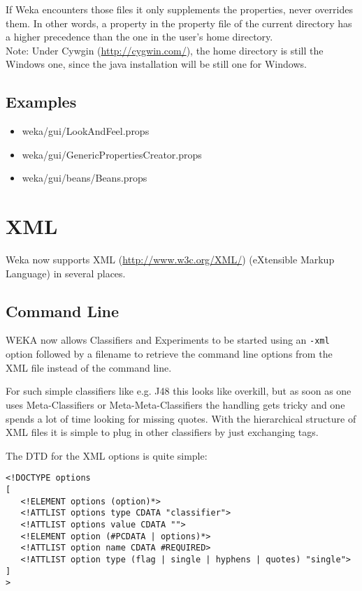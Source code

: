 \noindent If Weka encounters those files it only supplements the
properties, never overrides them. In other words, a property in the
property file of the current directory has a higher precedence than
the one in the user's home directory.\\

\noindent Note: Under Cywgin (\url{http://cygwin.com/}{}), the home directory
is still the Windows one, since the java installation will be still
one for Windows.

\subsection{Examples}

\begin{itemize}
\item weka/gui/LookAndFeel.props
\item weka/gui/GenericPropertiesCreator.props
\item weka/gui/beans/Beans.props
\end{itemize}

\newpage
\section{XML}
Weka now supports XML (\url{http://www.w3c.org/XML/}{}) (eXtensible
Markup Language) in several places.

\subsection{Command Line}
\label{xml_command_line}
WEKA now allows Classifiers and Experiments to be started using an
\verb=-xml= option followed by a filename to retrieve the command line
options from the XML file instead of the command line.

For such simple classifiers like e.g. J48 this looks like overkill,
but as soon as one uses Meta-Classifiers or Meta-Meta-Classifiers the
handling gets tricky and one spends a lot of time looking for missing
quotes. With the hierarchical structure of XML files it is simple to
plug in other classifiers by just exchanging tags.

The DTD for the XML options is quite simple:

\begin{verbatim}
<!DOCTYPE options
[
   <!ELEMENT options (option)*>
   <!ATTLIST options type CDATA "classifier">
   <!ATTLIST options value CDATA "">
   <!ELEMENT option (#PCDATA | options)*>
   <!ATTLIST option name CDATA #REQUIRED>
   <!ATTLIST option type (flag | single | hyphens | quotes) "single">
]
>
\end{verbatim}


